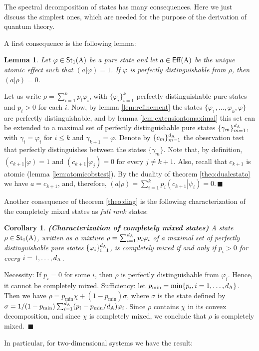 \documentclass[12pt,aps,pra,showpacs,groupedaddress]{revtex4-1}
\newtheorem{lemma}{Lemma} \newtheorem{proposition}{Proposition}
\newtheorem{corollary}{Corollary} \newtheorem{theorem}{Theorem}
\def\Proof{\medskip\par\noindent{\bf Proof. }}
\def\qed{$\,\blacksquare$\par}
\def\Cntset{{\mathsf{Eff}}}
\def\Stset{{\mathsf{St}}}
\def\SC#1#2{\left(#1\right|\left.\!#2\right)}  \def\Tr{{\rm Tr}}
\begin{document}
The spectral decomposition of states has many consequences.  Here we just discuss the simplest ones, which are needed for the purpose of the derivation of quantum theory.

A first  consequence is the following lemma:
\begin{lemma}\label{lem:fazero}
  Let $\varphi\in\Stset_1(\rA)$ be a pure state and let $a \in \Cntset (\rA)$ be the unique atomic effect such that
  $\SC a \varphi=1$. If $\varphi $ is perfectly distinguishable from $\rho$, then $\SC a \rho =0$.
\end{lemma}

\Proof Let us write $\rho = \sum_{i=1}^k p_i \varphi_i$, with
$\{\varphi_i\}_{i=1}^k$ perfectly distinguishable pure states and
$p_i>0$ for each $i$.  Now, by lemma \ref{lem:refinement} the states
$\{ \varphi_1, \dots, \varphi_k,\varphi\}$ are perfectly
distinguishable, and by lemma \ref{lem:extensiontomaximal} this set
can be extended to a maximal set of perfectly distinguishable pure
states $\{\gamma_m\}_{m=1}^{d_{\rm A}}$, with $\gamma_i=\varphi_i$ for
$i\leq k$ and $\gamma_{k+1} = \varphi$.  Denote by
$\{c_m\}_{m=1}^{d_{\rm A}}$ the observation test that perfectly
distinguishes between the states $\{\gamma_m\}$.  Note that, by
definition, $\SC {c_{k+1}}{\varphi}=1$ and $\SC {c_{k+1}}{\varphi_j} =
0$ for every $j\not = k+1$. Also, recall that $c_{k+1}$ is atomic
(lemma \ref{lem:atomicobstest}).  By the duality of theorem
\ref{theo:dualestato} we have $a= c_{k+1}$, and, therefore, $\SC {a}
\rho= \sum_{i =1 }^k p_i \SC {c_{k+1}} {\psi_i} = 0$.\qed



Another consequence of theorem \ref{theo:diag} is the following characterization of the completely
mixed states as \emph{full rank} states:

\begin{corollary}{\bf (Characterization of completely mixed states)}
  A state $\rho\in \Stset_1(\rA)$, written as a mixture $\rho
  =\sum_{i=1}^{d_{\rm A}} p_i \varphi_i$ of a maximal set of perfectly
  distinguishable pure states $\{\varphi_i\}_{i=1}^{d_{\rm A}}$, is
  completely mixed if and only if $p_i >0$ for every $i=1, \dots,
  d_{\rm A}$.
  \label{cor:complemi}
\end{corollary}
\Proof Necessity: If $p_i = 0$ for some $i$, then $\rho$ is perfectly distinguishable from $\varphi_i$.
Hence, it cannot be completely mixed.  Sufficiency: let $p_{\min} = \min\{ p_i, i=1, \dots,
d_{\rm A}\}$.  Then we have $\rho = p_{\min} \chi + (1- p_{\min}) \sigma$, where $\sigma$ is the state
defined by $\sigma = 1/ (1-p_{\min}) \sum_{i=1}^{d_{\rm A}} (p_i - p_{\min}/d_{\rm A}) \varphi_i$.
Since $\rho$ contains $\chi$ in its convex decomposition, and since $\chi$ is completely mixed, we conclude that $\rho$ is completely mixed. \qed In particular, for two-dimensional systems we have the result:
\end{document}
